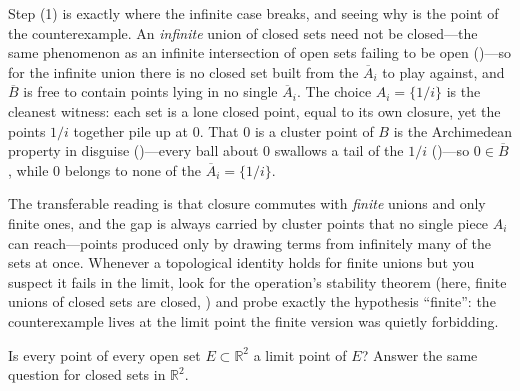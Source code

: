 \documentclass[main.tex]{subfiles}
\begin{document}
\begin{Reflection}
Step (1) is exactly where the infinite case breaks, and seeing why is the point of the counterexample. An
\emph{infinite} union of closed sets need not be closed---the same phenomenon as an infinite intersection of
open sets failing to be open ()---so for the infinite union there is no closed set built from the
$\overline{A}_{i}$ to play against, and $\overline{B}$ is free to contain points lying in no single
$\overline{A}_{i}$. The choice $A_{i}=\{1/i\}$ is the cleanest witness: each set is a lone closed point, equal
to its own closure, yet the points $1/i$ together pile up at $0$. That $0$ is a cluster point of $B$ is the
Archimedean property in disguise ()---every ball about $0$ swallows a
tail of the $1/i$ ()---so $0\in\overline{B}$, while $0$ belongs to none of the $\overline{A}_{i}=\{1/i\}$.

The transferable reading is that closure commutes with \emph{finite} unions and only finite ones, and the gap
is always carried by cluster points that no single piece $A_{i}$ can reach---points produced only by drawing
terms from infinitely many of the sets at once. Whenever a topological identity holds for finite unions but
you suspect it fails in the limit, look for the operation's stability theorem (here, finite unions of closed
sets are closed, ) and probe exactly the
hypothesis ``finite'': the counterexample lives at the limit point the finite version was quietly forbidding.
\end{Reflection}

Is every point of every open set $E\subset\mathbb R^{2}$ a limit point of $E$? Answer the same
question for closed sets in $\mathbb R^{2}$.
\end{document}
